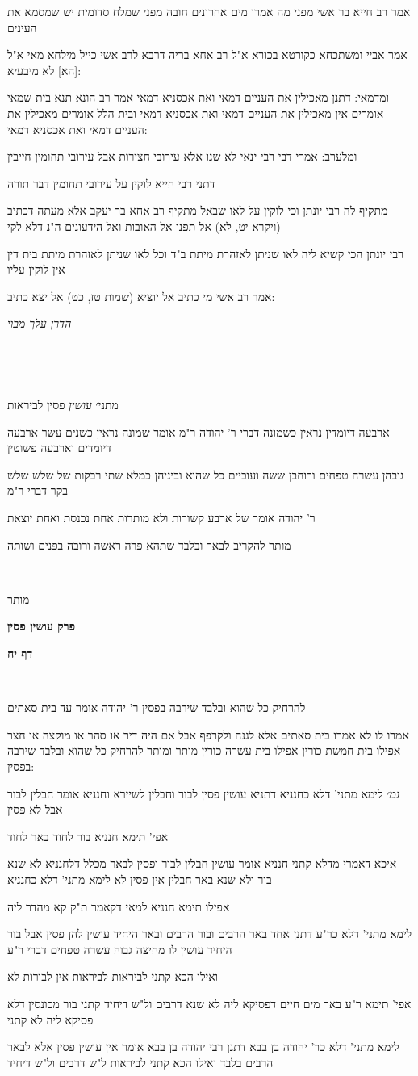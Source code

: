 \documentclass[12pt, openany]{book}
\newcommand{\sethebfont}{
\fontsize{10.5pt}{21.0pt} \selectfont
}
\newcommand{\textblock}[1]{
{\sethebfont #1\\}	
}
\newcommand{\chapname}{}
\newcommand{\sectname}{}
\newcommand{\newchap}[1]{
	\addcontentsline{toc}{chapter}{#1}
	\renewcommand{\chapname}{#1}
		\begin{center}
			\textbf{%
\fontsize{16pt}{16pt}\selectfont
				#1}
		\end{center}
}
\newcommand{\newsection}[1]{
	\addcontentsline{toc}{section}{#1}
	\renewcommand{\sectname}{#1}	
	\vspace{-\baselineskip}
	\begin{center}
		\textbf{%
\fontsize{16pt}{16pt}\selectfont
			#1}
	\end{center}
	\vspace{-\baselineskip}
	\nopagebreak
}
\begin{document}
\textblock{אמר רב חייא בר אשי מפני מה אמרו מים אחרונים חובה מפני שמלח סדומית יש שמסמא את העינים}
\textblock{אמר אביי ומשתכחא כקורטא בכורא א"ל רב אחא בריה דרבא לרב אשי כייל מילחא מאי א"ל [הא] לא מיבעיא:}
\textblock{ומדמאי: דתנן מאכילין את העניים דמאי ואת אכסניא דמאי אמר רב הונא תנא בית שמאי אומרים אין מאכילין את העניים דמאי ואת אכסניא דמאי ובית הלל אומרים מאכילין את העניים דמאי ואת אכסניא דמאי:}
\textblock{ומלערב: אמרי דבי רבי ינאי לא שנו אלא עירובי חצירות אבל עירובי תחומין חייבין}
\textblock{דתני רבי חייא לוקין על עירובי תחומין דבר תורה}
\textblock{מתקיף לה רבי יונתן וכי לוקין על לאו שבאל מתקיף רב אחא בר יעקב אלא מעתה דכתיב (ויקרא יט, לא) אל תפנו אל האובות ואל הידעונים ה"נ דלא לקי}
\textblock{רבי יונתן הכי קשיא ליה לאו שניתן לאזהרת מיתת ב"ד וכל לאו שניתן לאזהרת מיתת בית דין אין לוקין עליו}
\textblock{אמר רב אשי מי כתיב אל יוציא (שמות טז, כט) אל יצא כתיב:}
\textblock{\par \par {\large\emph{הדרן עלך מבוי}}\par \par }
\textblock{}
\textblock{מתני׳ {\large\emph{עושין}} פסין לביראות}
\textblock{ארבעה דיומדין נראין כשמונה דברי ר' יהודה ר"מ אומר שמונה נראין כשנים עשר ארבעה דיומדים וארבעה פשוטין}
\textblock{גובהן עשרה טפחים ורוחבן ששה ועוביים כל שהוא וביניהן כמלא שתי רבקות של שלש שלש בקר דברי ר"מ}
\textblock{ר' יהודה אומר של ארבע קשורות ולא מותרות אחת נכנסת ואחת יוצאת}
\textblock{מותר להקריב לבאר ובלבד שתהא פרה ראשה ורובה בפנים ושותה}
\textblock{}
\textblock{מותר}
\newchap{פרק \quad עושין פסין}
\newsection{דף יח}
\textblock{}
\textblock{להרחיק כל שהוא ובלבד שירבה בפסין ר' יהודה אומר עד בית סאתים}
\textblock{אמרו לו לא אמרו בית סאתים אלא לגנה ולקרפף אבל אם היה דיר או סהר או מוקצה או חצר אפילו בית חמשת כורין אפילו בית עשרה כורין מותר ומותר להרחיק כל שהוא ובלבד שירבה בפסין:}
\textblock{{\large\emph{גמ׳}} לימא מתני' דלא כחנניא דתניא עושין פסין לבור וחבלין לשיירא וחנניא אומר חבלין לבור אבל לא פסין}
\textblock{אפי' תימא חנניא בור לחוד באר לחוד}
\textblock{איכא דאמרי מדלא קתני חנניא אומר עושין חבלין לבור ופסין לבאר מכלל דלחנניא לא שנא בור ולא שנא באר חבלין אין פסין לא לימא מתני' דלא כחנניא}
\textblock{אפילו תימא חנניא למאי דקאמר ת"ק קא מהדר ליה}
\textblock{לימא מתני' דלא כר"ע דתנן אחד באר הרבים ובור הרבים ובאר היחיד עושין להן פסין אבל בור היחיד עושין לו מחיצה גבוה עשרה טפחים דברי ר"ע}
\textblock{ואילו הכא קתני לביראות לביראות אין לבורות לא}
\textblock{אפי' תימא ר"ע באר מים חיים דפסיקא ליה לא שנא דרבים ול"ש דיחיד קתני בור מכונסין דלא פסיקא ליה לא קתני}
\textblock{לימא מתני' דלא כר' יהודה בן בבא דתנן רבי יהודה בן בבא אומר אין עושין פסין אלא לבאר הרבים בלבד ואילו הכא קתני לביראות ל"ש דרבים ול"ש דיחיד}
\end{document}
